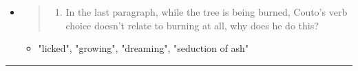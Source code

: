 \documentclass[letterpaper]{article}
\begin{document}
\begin{itemize}
\item \begin{quote}


\begin{enumerate}
\item In the last paragraph, while the tree is being burned, Couto's
verb choice doesn't relate to burning at all, why does he do
this?
\end{enumerate}
\end{quote}

\begin{itemize}
\item "licked", "growing", "dreaming", "seduction of ash"
\end{itemize}
\end{itemize}

\noindent\rule{\textwidth}{0.5pt}
\end{document}
